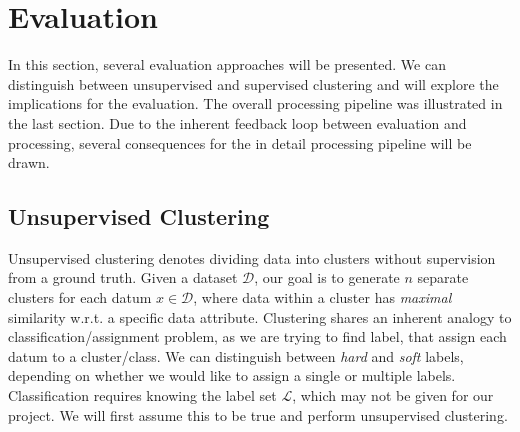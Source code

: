 \newpage %
\section{Evaluation}
\label{sec:eval}
In this section, several evaluation approaches will be presented. We can distinguish between unsupervised and supervised clustering and will explore the implications for the evaluation. The overall processing pipeline was illustrated in the last section. Due to the inherent feedback loop between evaluation and processing, several consequences for the in detail processing pipeline will be drawn.





\subsection{Unsupervised Clustering}
Unsupervised clustering denotes dividing data into clusters without supervision from a ground truth. Given a dataset $ \mathcal{D} $, our goal is to generate $ n $ separate clusters for each datum $ x \in \mathcal{D} $, where data within a cluster has \textit{maximal} similarity w.r.t. a specific data attribute. Clustering shares an inherent analogy to classification/assignment problem, as we are trying to find label, that assign each datum to a cluster/class. We can distinguish between \textit{hard} and \textit{soft} labels, depending on whether we would like to assign a single or multiple labels. Classification requires knowing the label set $ \mathcal{L} $, which may not be given for our project. We will first assume this to be true and perform unsupervised clustering. 

